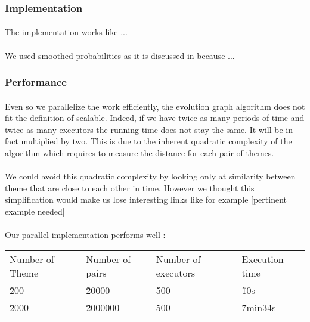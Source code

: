 \subsubsection{Implementation}
\label{sec:EvoGraphImplementation}
\paragraph{}
The implementation works like ...

\paragraph{}
We used smoothed probabilities as it is discussed in \cite{de2010grammatical} because ... 

\subsubsection{Performance}
\label{sec:EvoGraphPerformance}
\paragraph{}
Even so we parallelize the work efficiently, the evolution graph algorithm does not fit the definition of scalable. Indeed, if we have twice as many periods of time and twice as many executors the running time does not stay the same. It will be in fact multiplied by two. This is due to the inherent quadratic complexity of the algorithm which requires to measure the distance for each pair of themes.

\paragraph{}
We could avoid this quadratic complexity by looking only at similarity between theme that are close to each other in time. However we thought this simplification would make us lose interesting links like for example [pertinent example needed]

\paragraph{}
Our parallel implementation performs well :
\newline
\begin{tabular}{llll}
Number of Theme & Number of pairs & Number of executors & Execution time \\
\~ 200 & \~ 20000 & 500 & \~ 10s \\
\~ 2000 & \~ 2000000 & 500 & \~ 7min34s \\
\end{tabular}


